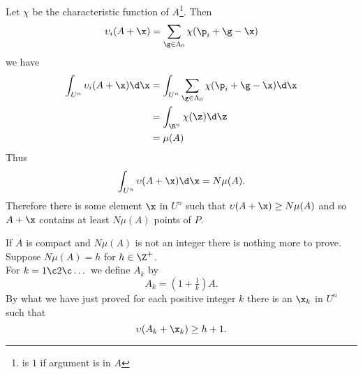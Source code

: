 Let $\chi$ be the characteristic function of $A$\footnote{is $1$ if argument is in $A$}.  Then
\[ \upsilon_i(A+\x) = \sum_{\g\in\Lambda_0}\chi(\p_i+\g-\x) \]
we have
\begin{align*}
\int_{U^n} \upsilon_i (A+\x)\d\x &= \int_{U^n}\sum_{\g\in\Lambda_0}\chi(\p_i+\g-\x)\d\x \\
&= \int_{\R^n}\chi(\z)\d\z \\
&= \mu(A)
\end{align*}
Thus
\[ \int_{U^n} \upsilon(A+\x)\d\x = N\mu(A) . \]
Therefore there is some element $\x$ in $U^n$ such that $\upsilon(A+\x)\geq N\mu(A)$ and so $A+\x$ contains at least $N\mu(A)$ points of $P$.

If $A$ is compact and $N\mu(A)$ is not an integer there is nothing more to prove.  Suppose $N\mu(A)=h$ for $h\in\Z^+$. \\
For $k=1\c 2\c \dotsc$ we define $A_k$ by
\[ A_k = (1+\tfrac1k)A . \]
By what we have just proved for each positive integer $k$ there is an $\x_k$ in $U^n$ such that
\[ \upsilon(A_k+\x_k) \geq h + 1 . \]
\vspace{-\baselineskip}
